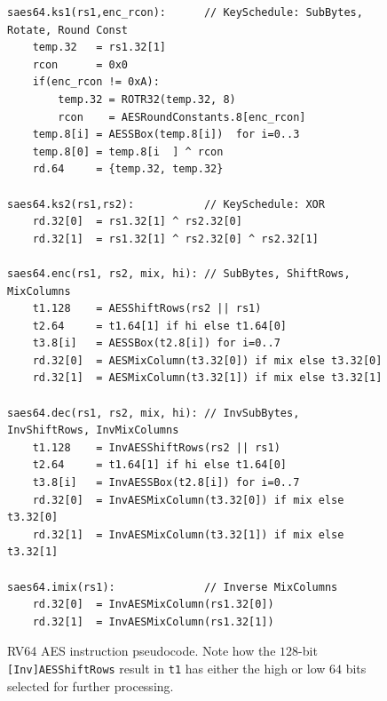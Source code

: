 \begin{figure}[h!]
\begin{lstlisting}[language=pseudo]
saes64.ks1(rs1,enc_rcon):      // KeySchedule: SubBytes, Rotate, Round Const
    temp.32   = rs1.32[1]
    rcon      = 0x0
    if(enc_rcon != 0xA):
        temp.32 = ROTR32(temp.32, 8)
        rcon    = AESRoundConstants.8[enc_rcon]
    temp.8[i] = AESSBox(temp.8[i])  for i=0..3
    temp.8[0] = temp.8[i  ] ^ rcon
    rd.64     = {temp.32, temp.32}

saes64.ks2(rs1,rs2):           // KeySchedule: XOR
    rd.32[0]  = rs1.32[1] ^ rs2.32[0]
    rd.32[1]  = rs1.32[1] ^ rs2.32[0] ^ rs2.32[1]

saes64.enc(rs1, rs2, mix, hi): // SubBytes, ShiftRows, MixColumns
    t1.128    = AESShiftRows(rs2 || rs1)
    t2.64     = t1.64[1] if hi else t1.64[0]
    t3.8[i]   = AESSBox(t2.8[i]) for i=0..7
    rd.32[0]  = AESMixColumn(t3.32[0]) if mix else t3.32[0]
    rd.32[1]  = AESMixColumn(t3.32[1]) if mix else t3.32[1]

saes64.dec(rs1, rs2, mix, hi): // InvSubBytes, InvShiftRows, InvMixColumns
    t1.128    = InvAESShiftRows(rs2 || rs1)
    t2.64     = t1.64[1] if hi else t1.64[0]
    t3.8[i]   = InvAESSBox(t2.8[i]) for i=0..7
    rd.32[0]  = InvAESMixColumn(t3.32[0]) if mix else t3.32[0]
    rd.32[1]  = InvAESMixColumn(t3.32[1]) if mix else t3.32[1]

saes64.imix(rs1):              // Inverse MixColumns
    rd.32[0]  = InvAESMixColumn(rs1.32[0])
    rd.32[1]  = InvAESMixColumn(rs1.32[1])
\end{lstlisting}
\caption{
RV64 AES instruction pseudocode.
Note how the $128$-bit {\tt [Inv]AESShiftRows} result in {\tt t1} has
either the high or low $64$ bits selected for further processing.
}
\label{fig:pesudo:aes:rv64}
\end{figure}

